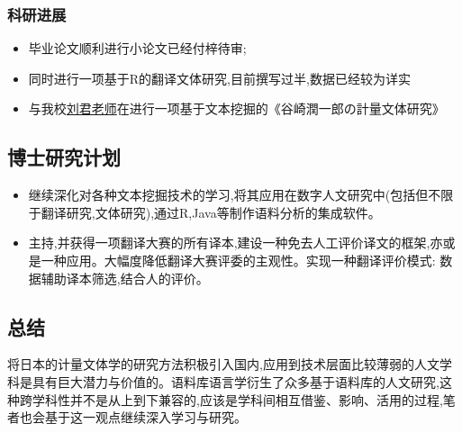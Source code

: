 \documentclass[
]{article}
\providecommand{\tightlist}{%
  \setlength{\itemsep}{0pt}\setlength{\parskip}{0pt}}
\begin{document}
\hypertarget{ux79d1ux7814ux8fdbux5c55}{%
\subsubsection{科研进展}\label{ux79d1ux7814ux8fdbux5c55}}

\begin{itemize}
\tightlist
\item
  毕业论文顺利进行小论文已经付梓待审;
\item
  同时进行一项基于R的翻译文体研究,目前撰写过半,数据已经较为详实
\item
  与我校\href{https://fls.gxu.edu.cn/info/1064/2382.htm}{刘君老师}在进行一项基于文本挖掘的《谷崎潤一郎の計量文体研究》
\end{itemize}

\hypertarget{ux535aux58ebux7814ux7a76ux8ba1ux5212}{%
\subsection{博士研究计划}\label{ux535aux58ebux7814ux7a76ux8ba1ux5212}}

\begin{itemize}
\item
  继续深化对各种文本挖掘技术的学习,将其应用在数字人文研究中(包括但不限于翻译研究,文体研究),通过R,Java等制作语料分析的集成软件。
\item
  主持,并获得一项翻译大赛的所有译本,建设一种免去人工评价译文的框架,亦或是一种应用。大幅度降低翻译大赛评委的主观性。实现一种翻译评价模式:
  数据辅助译本筛选,结合人的评价。
\end{itemize}

\hypertarget{ux603bux7ed3}{%
\subsection{总结}\label{ux603bux7ed3}}

将日本的计量文体学的研究方法积极引入国内,应用到技术层面比较薄弱的人文学科是具有巨大潜力与价值的。语料库语言学衍生了众多基于语料库的人文研究,这种跨学科性并不是从上到下兼容的,应该是学科间相互借鉴、影响、活用的过程,笔者也会基于这一观点继续深入学习与研究。
\end{document}
